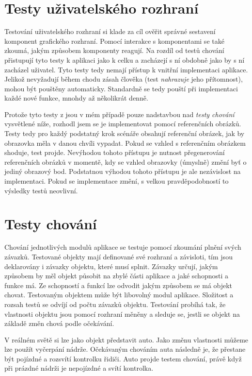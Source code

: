 \section{Testy uživatelského rozhraní}\label{testovani-ui}

Testování uživatelského rozhraní si klade za cíl ověřit správné sestavení komponent grafického rozhraní.
Pomocí interakce s komponentami se také zkoumá, jakým způsobem komponenty reagují.
Na rozdíl od testů chování přistupují tyto testy k aplikaci jako k celku a zacházejí s ní obdobně jako by s ní zacházel uživatel. Tyto testy tedy nemají přístup k vnitřní implementaci aplikace.
Jelikož nevyžadují během chodu zásah člověka (test \textit{nahrazuje} jeho přítomnost), mohou být pouštěny automaticky.
Standardně se tedy pouští při implementaci každé nové funkce, mnohdy až několikrát denně. \cite{apple-ui-testing}

Protože tyto testy z jsou v mém případě pouze nadstavbou nad \textit{testy chování} vysvětlené níže, rozhodl jsem se je implementovat pomocí referenčních obrázků.
Testy tedy pro každý podstatný krok scénáře obsahují referenční obrázek, jak by obrazovka měla v danou chvíli vypadat.
Pokud se vzhled s referenčním obrázkem shoduje, test projde.
Nevýhodou tohoto přístupu je nutnost přegenerování referenčních obrázků v momentě, kdy se vzhled obrazovky (úmyslně) změní byť o jediný obrazový bod.
Podstatnou výhodou tohoto přístupu je ale nezávislost na implementaci.
Pokud se implementace změní, s velkou pravděpodobností to výsledky testů neovlivní.

\section{Testy chování}\label{testovani-bdd}

Chování jednotlivých modulů aplikace se testuje pomocí zkoumání plnění svých závazků.
Testované objekty mají definované své rozhraní a závisloti, tím jsou deklarovány i závazky objektu, které musí splnit.
Závazky určují, jakým způsobem by měl objekt působit na zbylé části aplikace a jaké schopnosti a funkce má.
Ze schopností a funkcí lze odvodit jakým způsobem se má objekt chovat.
Testovaným objektem může být libovolný modul aplikace.
Složitost a rozsah testů se odvíjí od počtu závazků objektu.
Testování probíhá tak, že vlastnosti objektu jsou pomocí rozhraní měněny a sleduje se, jestli se objekt na základě změn chová podle očekávání. \cite{objcio-bdd}

V reálném světě si lze jako objekt představit auto.
Jako změnu vlastnosti můžeme lze použít vyčerpání nádrže.
Očekávaným chováním auta následně je, že přestane být pojízdné a rozsvítí kontrolku řidiči.
Auto projde testem chování, právě když při prázdné nádrži je nepojízdné a svítí kontrolka.

